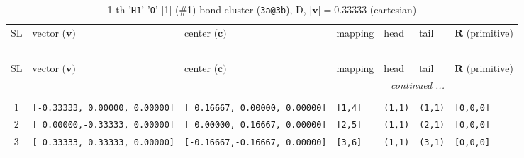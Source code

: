 \documentclass[fleqn,10pt,landscape]{jsarticle}
\begin{document}
\renewcommand{\arraystretch}{1.6}
\begin{longtable}[l]{cllllll}
\captionsetup{justification=raggedright, singlelinecheck=off}
\caption{1-th '\texttt{H1}'-'\texttt{O}' [1] (\#1) bond cluster (\texttt{3a@3b}), D, $|\bm{v}|=0.33333$ (cartesian)}
 \\
 \hline \hline
SL & vector ($\bm{v})$ & center ($\bm{c})$ & mapping & head & tail & $\bm{R}$ (primitive) \\ \hline \endfirsthead

\multicolumn{6}{l}{\tablename\ \thetable{}} \\
 \hline \hline
SL & vector ($\bm{v})$ & center ($\bm{c})$ & mapping & head & tail & $\bm{R}$ (primitive) \\ \hline \endhead

 \hline \hline
\multicolumn{6}{r}{\footnotesize\it continued ...} \\ \endfoot

 \hline \hline
\multicolumn{6}{r}{} \\ \endlastfoot

1 & \texttt{[-0.33333, 0.00000, 0.00000]} & \texttt{[ 0.16667, 0.00000, 0.00000]} & \texttt{[1,4]} & \texttt{(1,1)} & \texttt{(1,1)} & \texttt{[0,0,0]} \\ \hline
2 & \texttt{[ 0.00000,-0.33333, 0.00000]} & \texttt{[ 0.00000, 0.16667, 0.00000]} & \texttt{[2,5]} & \texttt{(1,1)} & \texttt{(2,1)} & \texttt{[0,0,0]} \\ \hline
3 & \texttt{[ 0.33333, 0.33333, 0.00000]} & \texttt{[-0.16667,-0.16667, 0.00000]} & \texttt{[3,6]} & \texttt{(1,1)} & \texttt{(3,1)} & \texttt{[0,0,0]} \\
\end{longtable}
\renewcommand{\arraystretch}{1.6}
\end{document}
